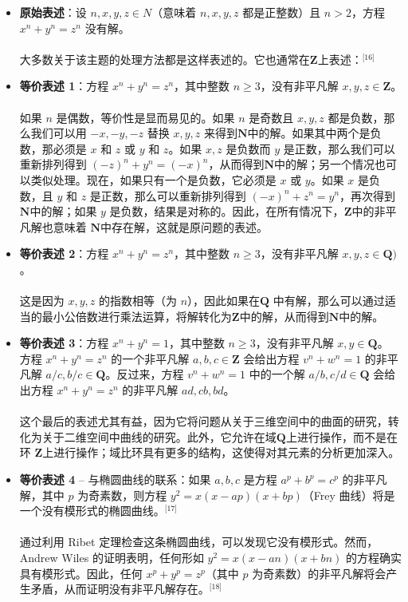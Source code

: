 \begin{itemize}
\item \textbf{原始表述}：设 \( n, x, y, z \in N \)（意味着 \( n, x, y, z \) 都是正整数）且 \( n > 2 \)，方程 \( x^n + y^n = z^n \) 没有解。\\\\  
大多数关于该主题的处理方法都是这样表述的。它也通常在\( \mathbf{Z} \)上表述：\(^\text{[16]}\)
\item \textbf{等价表述 1}：方程 \( x^n + y^n = z^n \)，其中整数 \( n \geq 3 \)，没有非平凡解 \( x, y, z \in \mathbf{Z} \)。\\\\  
如果 \( n \) 是偶数，等价性是显而易见的。如果 \( n \) 是奇数且 \( x, y, z \) 都是负数，那么我们可以用 \( -x, -y, -z \) 替换 \( x, y, z \) 来得到\( \mathbf{N} \)中的解。如果其中两个是负数，那必须是 \( x \) 和 \( z \) 或 \( y \) 和 \( z \)。如果 \( x, z \) 是负数而 \( y \) 是正数，那么我们可以重新排列得到 \( (-z)^n + y^n = (-x)^n \)，从而得到\( \mathbf{N} \)中的解；另一个情况也可以类似处理。现在，如果只有一个是负数，它必须是 \( x \) 或 \( y \)。如果 \( x \) 是负数，且 \( y \) 和 \( z \) 是正数，那么可以重新排列得到 \( (-x)^n + z^n = y^n \)，再次得到\( \mathbf{N} \)中的解；如果 \( y \) 是负数，结果是对称的。因此，在所有情况下，\( \mathbf{Z} \)中的非平凡解也意味着 \( \mathbf{N} \)中存在解，这就是原问题的表述。
\item \textbf{等价表述 2}：方程 \( x^n + y^n = z^n \)，其中整数 \( n \geq 3 \)，没有非平凡解 \( x, y, z \in \mathbf{Q}) \)。\\\\ 
这是因为 \( x, y, z \) 的指数相等（为 \( n \)），因此如果在\( \mathbf{Q} \) 中有解，那么可以通过适当的最小公倍数进行乘法运算，将解转化为\( \mathbf{Z} \)中的解，从而得到\( \mathbf{N} \)中的解。
\item \textbf{等价表述 3}：方程 \( x^n + y^n = 1 \)，其中整数 \( n \geq 3 \)，没有非平凡解 \( x, y \in \mathbf{Q} \)。\\  
方程 \( x^n + y^n = z^n \) 的一个非平凡解 \( a, b, c \in \mathbf{Z} \) 会给出方程 \( v^n + w^n = 1 \) 的非平凡解 \( a/c, b/c \in \mathbf{Q}\)。反过来，方程 \( v^n + w^n = 1 \) 中的一个解 \( a/b, c/d \in \mathbf{Q}\) 会给出方程 \( x^n + y^n = z^n \) 的非平凡解 \( ad, cb, bd \)。\\\\
这个最后的表述尤其有益，因为它将问题从关于三维空间中的曲面的研究，转化为关于二维空间中曲线的研究。此外，它允许在域\( \mathbf{Q} \)上进行操作，而不是在环 \( \mathbf{Z} \)上进行操作；域比环具有更多的结构，这使得对其元素的分析更加深入。
\item \textbf{等价表述 4} – 与椭圆曲线的联系：如果 \( a, b, c \) 是方程 \( a^p + b^p = c^p \) 的非平凡解，其中 \( p \) 为奇素数，则方程 \( y^2 = x(x - ap)(x + bp) \)（Frey 曲线）将是一个没有模形式的椭圆曲线。\(^\text{[17]}\)\\\\  
通过利用 Ribet 定理检查这条椭圆曲线，可以发现它没有模形式。然而，Andrew Wiles 的证明表明，任何形如 \( y^2 = x(x - an)(x + bn) \) 的方程确实具有模形式。因此，任何 \( x^p + y^p = z^p \)（其中 \( p \) 为奇素数）的非平凡解将会产生矛盾，从而证明没有非平凡解存在。\(^\text{[18]}\)
\end{itemize}
